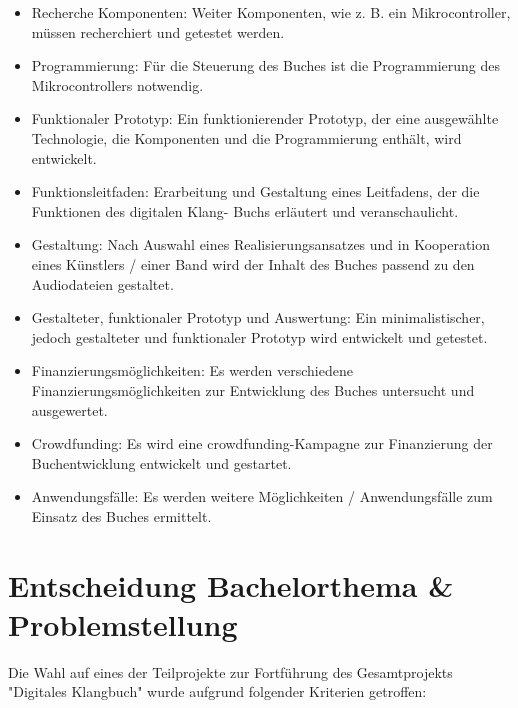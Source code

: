 \begin{itemize}
\item Recherche Komponenten: Weiter Komponenten, wie z. B. ein Mikrocontroller, müssen recherchiert und getestet werden.
\item Programmierung: Für die Steuerung des Buches ist die Programmierung des Mikrocontrollers notwendig.
\item Funktionaler Prototyp: Ein funktionierender Prototyp, der eine ausgewählte Technologie, die Komponenten und die Programmierung enthält, wird entwickelt.
\item Funktionsleitfaden: Erarbeitung und Gestaltung eines Leitfadens, der die Funktionen des digitalen Klang- Buchs erläutert und veranschaulicht.
\item Gestaltung: Nach Auswahl eines Realisierungsansatzes und in Kooperation eines Künstlers / einer Band wird der Inhalt des Buches passend zu den Audiodateien gestaltet.
\item Gestalteter, funktionaler Prototyp und Auswertung: Ein minimalistischer, jedoch gestalteter und funktionaler Prototyp wird entwickelt und getestet.
\item Finanzierungsmöglichkeiten: Es werden verschiedene Finanzierungsmöglichkeiten zur Entwicklung des Buches untersucht und ausgewertet.
\item Crowdfunding: Es wird eine \gls{crowdfunding}-Kampagne zur Finanzierung der Buchentwicklung entwickelt und gestartet.
\item Anwendungsfälle: Es werden weitere Möglichkeiten / Anwendungsfälle zum Einsatz des Buches ermittelt.
\end{itemize}








\section{Entscheidung Bachelorthema \& Problemstellung}\label{einleitung_problem}
Die Wahl auf eines der Teilprojekte zur Fortführung des Gesamtprojekts "Digitales Klangbuch" wurde aufgrund folgender Kriterien getroffen:\\

